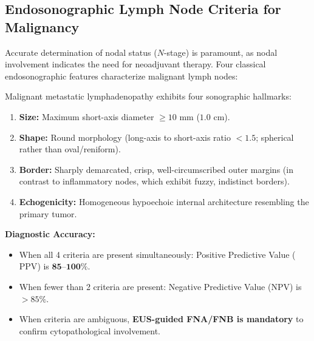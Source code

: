 \documentclass[11pt,a4paper]{article}
\begin{document}
\subsection{Endosonographic Lymph Node Criteria for Malignancy}
Accurate determination of nodal status ($N$-stage) is paramount, as nodal involvement indicates the need for neoadjuvant therapy. Four classical endosonographic features characterize malignant lymph nodes:

\begin{protocolbox}
Malignant metastatic lymphadenopathy exhibits four sonographic hallmarks:
\begin{enumerate}[leftmargin=1.5em]
    \item \textbf{Size:} Maximum short-axis diameter $\ge 10\text{ mm}$ ($1.0\text{ cm}$).
    \item \textbf{Shape:} Round morphology (long-axis to short-axis ratio $< 1.5$; spherical rather than oval/reniform).
    \item \textbf{Border:} Sharply demarcated, crisp, well-circumscribed outer margins (in contrast to inflammatory nodes, which exhibit fuzzy, indistinct borders).
    \item \textbf{Echogenicity:} Homogeneous hypoechoic internal architecture resembling the primary tumor.
\end{enumerate}
\textbf{Diagnostic Accuracy:}
\begin{itemize}
    \item When all 4 criteria are present simultaneously: Positive Predictive Value ($\text{PPV}$) is $\mathbf{85\text{--}100\%}$.
    \item When fewer than 2 criteria are present: Negative Predictive Value ($\text{NPV}$) is $> 85\%$.
    \item When criteria are ambiguous, \textbf{EUS-guided FNA/FNB is mandatory} to confirm cytopathological involvement.
\end{itemize}
\end{protocolbox}
\end{document}
